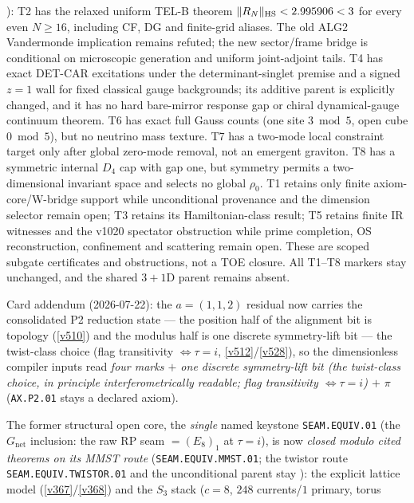 \documentclass[11pt,a4paper]{article}
\begin{document}
):
T2 has the relaxed uniform TEL-B theorem $\|R_N\|_{\rm HS}<2.995906<3$
for every even $N\ge16$, including CF, DG and finite-grid aliases. The old
ALG2 Vandermonde implication remains refuted; the new sector/frame bridge
is conditional on microscopic generation and uniform joint-adjoint tails.
T4 has exact DET-CAR excitations under the determinant-singlet premise and
a signed $z=1$ wall for fixed classical gauge backgrounds; its additive
parent is explicitly changed, and it has no hard bare-mirror response gap
or chiral dynamical-gauge continuum theorem. T6 has exact full Gauss counts
(one site $3\bmod5$, open cube $0\bmod5$), but no neutrino mass texture.
T7 has a two-mode local constraint target only after global zero-mode removal,
not an emergent graviton. T8 has a symmetric internal $D_4$ cap with gap one,
but symmetry permits a two-dimensional invariant space and selects no global
$\rho_0$. T1 retains only
finite axiom-core/W-bridge support while unconditional provenance and the dimension
selector remain open; T3 retains its Hamiltonian-class result; T5 retains finite IR
witnesses and the v1020 spectator obstruction while prime completion, OS reconstruction,
confinement and scattering remain open. These are scoped subgate certificates and
obstructions, not a TOE closure.  All T1--T8 markers stay unchanged, and the shared
$3{+}1$D parent remains absent.
\par\smallskip
\noindent Card addendum (2026-07-22): the $a=(1,1,2)$ residual now carries the consolidated P2
reduction state --- the position half of the alignment bit is topology (\vref{v510}) and the modulus
half is one discrete symmetry-lift bit --- the twist-class choice (flag transitivity
$\iff\tau=i$, \vref{v512}/\vref{v528}), so the
dimensionless compiler inputs read \emph{four marks $+$ one discrete symmetry-lift bit (the
twist-class choice, in principle interferometrically readable; flag
transitivity $\iff\tau=i$) $+$ $\pi$}
(\texttt{AX.P2.01} stays a declared axiom).
\par\smallskip
\noindent The former structural open core, the \emph{single} named keystone \texttt{SEAM.EQUIV.01} (the
$G_{\mathrm{net}}$ inclusion: the raw RP seam $=(E_8)_1$ at $\tau{=}i$), is now \emph{closed modulo cited theorems
on its MMST route} (\texttt{SEAM.EQUIV.MMST.01}; the twistor route \texttt{SEAM.EQUIV.TWISTOR.01} and the
unconditional parent stay \mO):
the explicit lattice model (\vref{v367}/\vref{v368}) and the $S_3$ stack ($c{=}8$, $248$ currents/$1$ primary, torus
\end{document}
